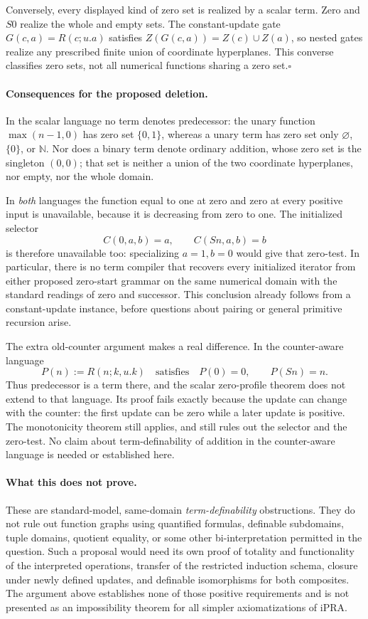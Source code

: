Conversely, every displayed kind of zero set is realized by a scalar
term. Zero and $S0$ realize the whole and empty sets. The constant-update
gate $G(c,a)=R(c;u.a)$ satisfies
$Z(G(c,a))=Z(c)\cup Z(a)$, so nested gates realize any prescribed finite
union of coordinate hyperplanes. This converse classifies zero sets,
not all numerical functions sharing a zero set.\hfill$\square$

\paragraph{Consequences for the proposed deletion.}
In the scalar language no term denotes predecessor: the unary function
$\max(n-1,0)$ has zero set $\{0,1\}$, whereas a unary term has zero set
only $\varnothing$, $\{0\}$, or $\mathbb N$. Nor does a binary term
denote ordinary addition, whose zero set is the singleton $(0,0)$;
that set is neither a union of the two coordinate hyperplanes, nor empty,
nor the whole domain.

In \emph{both} languages the function equal to one at zero and zero at
every positive input is unavailable, because it is decreasing from zero
to one. The initialized selector
\[
 C(0,a,b)=a,\qquad C(Sn,a,b)=b
\]
is therefore unavailable too: specializing $a=1,b=0$ would give that
zero-test. In particular, there is no term compiler that recovers every
initialized iterator from either proposed zero-start grammar on the
same numerical domain with the standard readings of zero and successor.
This conclusion already follows from a constant-update instance, before
questions about pairing or general primitive recursion arise.

The extra old-counter argument makes a real difference. In the
counter-aware language
\[
 P(n):=R(n;k,u.k)
 \quad\text{satisfies}\quad P(0)=0,\qquad P(Sn)=n.
\]
Thus predecessor is a term there, and the scalar zero-profile theorem
does not extend to that language. Its proof fails exactly because the
update can change with the counter: the first update can be zero while
a later update is positive. The monotonicity theorem still applies, and
still rules out the selector and the zero-test. No claim about
term-definability of addition in the counter-aware language is needed
or established here.

\paragraph{What this does not prove.}
These are standard-model, same-domain \emph{term-definability}
obstructions. They do not rule out function graphs using quantified
formulas, definable subdomains, tuple domains, quotient equality, or
some other bi-interpretation permitted in the question. Such a proposal
would need its own proof of totality and functionality of the interpreted
operations, transfer of the restricted induction schema, closure under
newly defined updates, and definable isomorphisms for both composites.
The argument above establishes none of those positive requirements and
is not presented as an impossibility theorem for all simpler
axiomatizations of iPRA.
